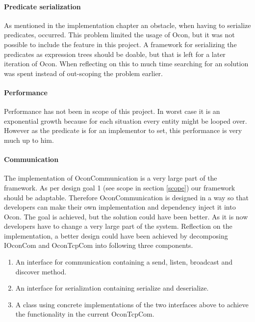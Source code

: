 \documentclass[../report.tex]{subfiles}
\begin{document}
\graphicspath{{img/}{../img/}}

\paragraph{Predicate serialization}
As mentioned in the implementation chapter an obstacle, when having to serialize predicates, occurred. This problem limited the usage of Ocon, but it was not possible to include the feature in this project. A framework for serializing the predicates as expression trees should be doable, but that is left for a later iteration of Ocon. When reflecting on this to much time searching for an solution was spent instead of out-scoping the problem earlier. 


\paragraph{Performance}
Performance has not been in scope of this project. In worst case it is an exponential growth because for each situation every entity might be looped over. However as the predicate is for an implementor to set, this performance is very much up to him.

\paragraph{Communication}
The implementation of OconCommunication is a very large part of the framework. As per design goal 1 (see scope in section \ref{scope}) our framework should be adaptable. Therefore OconCommunication is designed in a way so that developers can make their own implementation and dependency inject it into Ocon. The goal is achieved, but the solution could have been better. As it is now developers have to change a very large part of the system. Reflection on the implementation, a better design could have been achieved by decomposing IOconCom and OconTcpCom into following three components.



\begin{enumerate}
\item An interface for communication containing a send, listen, broadcast and discover method.
\item An interface for serialization containing serialize and deserialize.
\item A class using concrete implementations of the two interfaces above to achieve the functionality in the current OconTcpCom.
\end{enumerate}
\end{document}
